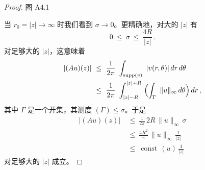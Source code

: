 \begin{proof}
\begin{minipage}{\linewidth}
图 A4.1
\end{minipage}

当 $r_{0}=|z|\to\infty$ 时我们看到 $\sigma\to0$。更精确地，对大的 $|z|$ 有
\[
0\ \leq\ \sigma\ \leq\ \frac{4R}{|z|}\,.
\]
对足够大的 $|z|$，这意味着
\begin{align*}
|(Au)(z)|\ &\leq\ \frac{1}{2\pi}\ \int_{\operatorname{supp}(v)}\ |v(r,\theta)|\,dr\,d\theta\\
&\leq\ \frac{1}{2\pi}\ \int_{|z|-R}^{|z|+R}\ \Bigl(\int_{\Gamma}\ \|u\|_{\infty}\,d\theta\Bigr)\,dr\,,
\end{align*}
其中 $\Gamma$ 是一个开集，其测度 $(\Gamma)\leq\sigma$。于是
\begin{align*}
|(Au)(z)|\ &\leq\ \tfrac{1}{2\pi}\,2R\,\|u\|_{\infty}\,\sigma\\
&\leq\ \tfrac{4R^{2}}{\pi}\,\|u\|_{\infty}\,\tfrac{1}{|z|}\\
&\leq\ \operatorname{const}\,(u)\,\tfrac{1}{|z|}
\end{align*}
对足够大的 $|z|$ 成立。
\end{proof}

